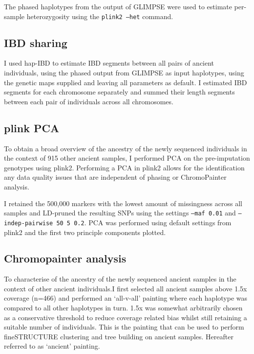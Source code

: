 The phased haplotypes from the output of GLIMPSE were used to estimate per-sample heterozygosity using the \texttt{plink2 --het} command.

\subsection{IBD sharing}

I used hap-IBD \cite{zhou2020fast} to estimate IBD segments between all pairs of ancient individuals, using the phased output from GLIMPSE as input haplotypes, using the genetic maps supplied and leaving all parameters as default. I estimated IBD segments for each chromosome separately and summed their length segments between each pair of individuals across all chromosomes. 

\subsection{plink PCA}

To obtain a broad overview of the ancestry of the newly sequenced individuals in the context of 915 other ancient samples, I performed PCA on the pre-imputation genotypes using plink2. Performing a PCA in plink2 allows for the identification any data quality issues that are independent of phasing or ChromoPainter analysis. 

I retained the 500,000 markers with the lowest amount of missingness across all samples and LD-pruned the resulting SNPs using the settings \texttt{--maf 0.01} and \texttt{--indep-pairwise 50 5 0.2}. PCA was performed using default settings from plink2 and the first two principle components plotted.

\subsection{Chromopainter analysis}

To characterise of the ancestry of the newly sequenced ancient samples in the context of other ancient individuals.I first selected all ancient samples above 1.5x coverage (n=466) and performed an `all-v-all' painting where each haplotype was compared to all other haplotypes in turn. 1.5x was somewhat arbitrarily chosen as a conservative threshold to reduce coverage related bias whilst still retaining a suitable number of individuals. This is the painting that can be used to perform fineSTRUCTURE clustering and tree building on ancient samples. Hereafter referred to as `ancient' painting.

